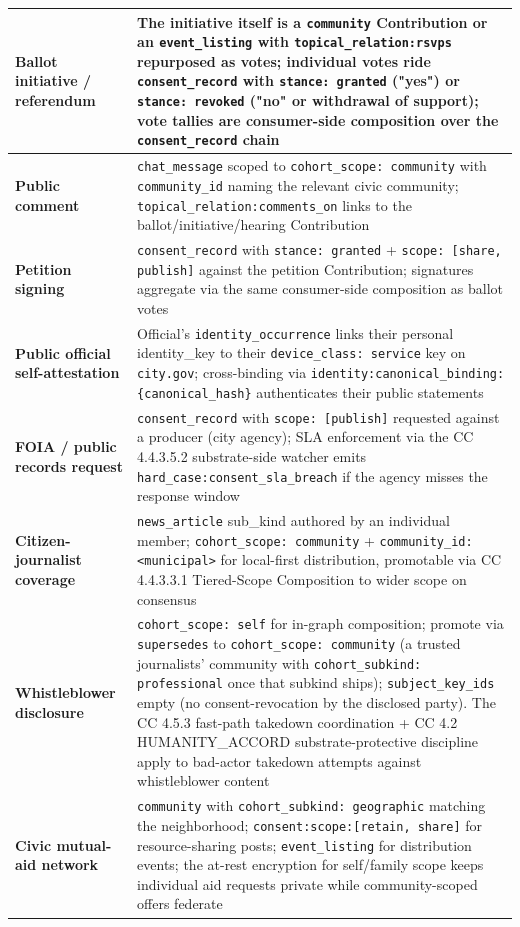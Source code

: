 \documentclass[11pt]{article}
\begin{document}
{\begin{longtable}{|p{8.0cm}|p{8.0cm}|}
\textbf{Ballot initiative / referendum} & The initiative itself is a \texttt{community} Contribution or an \texttt{event\_listing} with \texttt{topical\_relation:rsvps} repurposed as votes; individual votes ride \texttt{consent\_record} with \texttt{stance: granted} ("yes") or \texttt{stance: revoked} ("no" or withdrawal of support); vote tallies are consumer-side composition over the \texttt{consent\_record} chain \\ \hline
\textbf{Public comment} & \texttt{chat\_message} scoped to \texttt{cohort\_scope: community} with \texttt{community\_id} naming the relevant civic community; \texttt{topical\_relation:comments\_on} links to the ballot/initiative/hearing Contribution \\ \hline
\textbf{Petition signing} & \texttt{consent\_record} with \texttt{stance: granted} + \texttt{scope: [share, publish]} against the petition Contribution; signatures aggregate via the same consumer-side composition as ballot votes \\ \hline
\textbf{Public official self-attestation} & Official's \texttt{identity\_occurrence} links their personal identity\_key to their \texttt{device\_class: service} key on \texttt{city.gov}; cross-binding via \texttt{identity:canonical\_binding:\{canonical\_hash\}} authenticates their public statements \\ \hline
\textbf{FOIA / public records request} & \texttt{consent\_record} with \texttt{scope: [publish]} requested against a producer (city agency); SLA enforcement via the CC 4.4.3.5.2 substrate-side watcher emits \texttt{hard\_case:consent\_sla\_breach} if the agency misses the response window \\ \hline
\textbf{Citizen-journalist coverage} & \texttt{news\_article} sub\_kind authored by an individual member; \texttt{cohort\_scope: community} + \texttt{community\_id: <municipal>} for local-first distribution, promotable via CC 4.4.3.3.1 Tiered-Scope Composition to wider scope on consensus \\ \hline
\textbf{Whistleblower disclosure} & \texttt{cohort\_scope: self} for in-graph composition; promote via \texttt{supersedes} to \texttt{cohort\_scope: community} (a trusted journalists' community with \texttt{cohort\_subkind: professional} once that subkind ships); \texttt{subject\_key\_ids} empty (no consent-revocation by the disclosed party). The CC 4.5.3 fast-path takedown coordination + CC 4.2 HUMANITY\_ACCORD substrate-protective discipline apply to bad-actor takedown attempts against whistleblower content \\ \hline
\textbf{Civic mutual-aid network} & \texttt{community} with \texttt{cohort\_subkind: geographic} matching the neighborhood; \texttt{consent:scope:[retain, share]} for resource-sharing posts; \texttt{event\_listing} for distribution events; the at-rest encryption for self/family scope keeps individual aid requests private while community-scoped offers federate \\ \hline
\end{longtable}}
\end{document}
